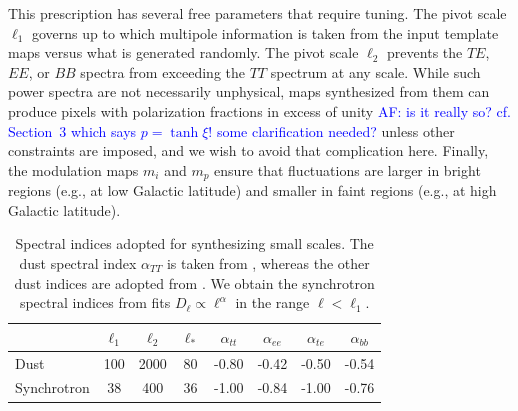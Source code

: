 \documentclass[twocolumn]{aastex631}
\newcommand{\af}[1]{\textcolor{blue}{#1}}
\begin{document}
This prescription has several free parameters that require tuning. The pivot scale $\ell_1$ governs up to which multipole information is taken from the input template maps versus what is generated randomly. The pivot scale $\ell_2$ prevents the $TE$, $EE$, or $BB$ spectra from exceeding the $TT$ spectrum at any scale. While such power spectra are not necessarily unphysical, maps synthesized from them can produce pixels with polarization fractions in excess of unity \af{AF: is it really so? cf. Section~3 which says $p=\tanh\xi$! some clarification needed?} unless other constraints are imposed, and we wish to avoid that complication here. Finally, the modulation maps $m_i$ and $m_p$ ensure that fluctuations are larger in bright regions (e.g., at low Galactic latitude) and smaller in faint regions (e.g., at high Galactic latitude).


\begin{table}
    \centering
    \footnotesize
    \begin{tabular}{lccccccc}
    \toprule 
   &   $ \ell_1  $&$\ell_2$   &$\ell_* $& $\alpha_{tt}$  & $\alpha_{ee}$ &$\alpha_{te}$ &$\alpha_{bb}$ \\
   \midrule  
   Dust & 100 & 2000 & 80 & -0.80 & -0.42& -0.50 & -0.54 \\ 
   Synchrotron & 38 & 400 & 36 & -1.00& -0.84 & -1.00 & -0.76 \\
   \bottomrule
    \end{tabular}
    \caption{Spectral indices adopted for synthesizing  small scales. The dust spectral index $\alpha_{TT}$ is taken from \citet{Miville-Deschenes:2016}, whereas the other dust indices are adopted from \citet{planck2016-l11A}. We obtain the synchrotron spectral indices  from fits $D_{\ell} \propto \ell^{\alpha}$ in the range $\ell<\ell_1$.}
    \label{tab:smallscale_par}
\end{table}
\end{document}
